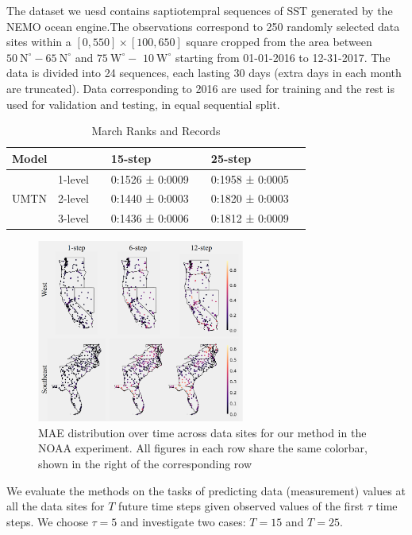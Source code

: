 \documentclass{apmcmthesis}
\begin{document}
The dataset we uesd contains saptiotempral sequences of SST generated by the NEMO ocean engine.The observations correspond to 250 randomly selected data sites within a $[0,550] \times[100,650]$ square cropped from the area between $50 \mathrm{~N}^{\circ}-65 \mathrm{~N}^{\circ}$ and $75 \mathrm{~W}^{\circ}-$ $10 \mathrm{~W}^{\circ}$ starting from 01-01-2016 to 12-31-2017. The data is divided into 24 sequences, each lasting 30 days (extra days in each month are truncated). Data corresponding to 2016 are used for training and the rest is used for validation and testing, in equal sequential split.
\begin{table}
\centering
\caption{March Ranks and Records}
\begin{tabular}{llll} 
\toprule
\multicolumn{2}{l}{Model~~ } & 15-step~~         & 25-step~~          \\
\midrule
     & 1-level~~             & 0:1526 ± 0:0009~~ & 0:1958 ± 0:0005~~  \\
UMTN & 2-level~~             & 0:1440 ± 0:0003~~ & 0:1820 ± 0:0003~~  \\
     & 3-level               & 0:1436 ± 0:0006~~ & 0:1812 ± 0:0009~~  \\
\bottomrule
\end{tabular}
\end{table}
\begin{figure}
    \centering
    \includegraphics[height=6cm]{APMCMThesis/figures/mae.png}
    \caption{MAE distribution over time across data sites for our method in the NOAA experiment. All figures in each row
share the same colorbar, shown in the right of the corresponding row}
    \label{fig:my_label}
\end{figure}

We evaluate the methods on the tasks of predicting data (measurement) values at all the data sites for $T$ future time steps given observed values of the first $\tau$ time steps. We choose $\tau=5$ and investigate two cases: $T=15$ and $T=25$.
\end{document}
